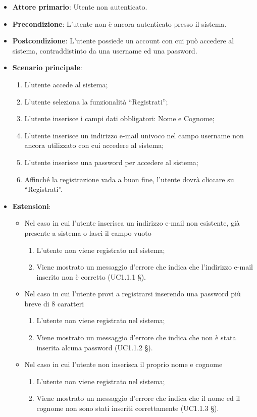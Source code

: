 \begin{itemize}
\item \textbf{Attore primario}: Utente non autenticato.
\item \textbf{Precondizione}: L'utente non è ancora autenticato presso il sistema.
\item \textbf{Postcondizione}: L’utente possiede un account con cui può accedere al sistema, contraddistinto da una username ed una password.

\item \textbf{Scenario principale}:
\begin{enumerate}
\item L’utente accede al sistema;
\item L’utente seleziona la funzionalità “Registrati”;
\item L'utente inserisce i campi dati obbligatori: Nome e Cognome;
\item L’utente inserisce un indirizzo e-mail univoco nel campo username non ancora utilizzato con cui accedere al sistema; 
\item L’utente inserisce una password per accedere al sistema;
\item Affinché la registrazione vada a buon fine, l’utente dovrà cliccare su “Registrati”.
\end{enumerate}

\item \textbf{Estensioni}:
\begin{itemize}
\item Nel caso in cui l’utente inserisca un indirizzo e-mail non esistente, già presente a sistema o lasci il campo vuoto
\begin{enumerate}
	\item L’utente non viene registrato nel sistema;
	\item Viene mostrato un messaggio d’errore che indica che l'indirizzo e-mail inserito non è corretto (UC1.1.1 §).
\end{enumerate}
\item Nel caso in cui l’utente provi a registrarsi inserendo una password più breve di 8 caratteri
\begin{enumerate}
	\item L’utente non viene registrato nel sistema;
	\item Viene mostrato un messaggio d’errore che indica che non è stata inserita alcuna password (UC1.1.2 §).
\end{enumerate}
\item{Nel caso in cui l'utente non inserisca il proprio nome e cognome}
\begin{enumerate}
	\item L'utente non viene registrato nel sistema;
	\item Viene mostrato un messaggio d'errore che indica che il nome ed il cognome non sono stati inseriti correttamente (UC1.1.3 §).
\end{enumerate}
\end{itemize}
\end{itemize}

